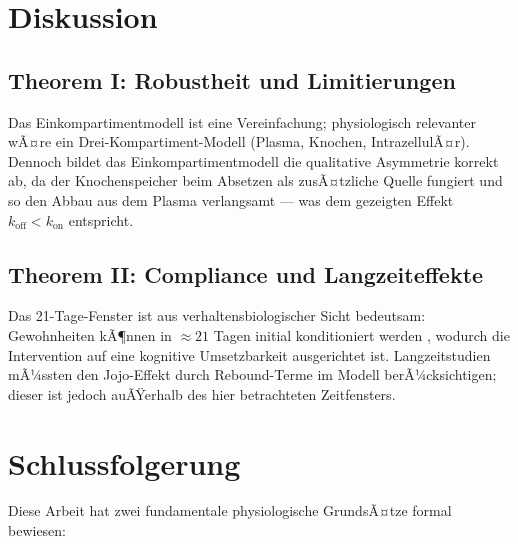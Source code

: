 ﻿\documentclass[12pt,a4paper]{article}
\theoremstyle{plain}
\theoremstyle{definition}
\theoremstyle{remark}
\begin{document}
\section{Diskussion}
\label{sec:disc}

\subsection{Theorem I: Robustheit und Limitierungen}

Das Einkompartimentmodell ist eine Vereinfachung; physiologisch relevanter
wÃ¤re ein Drei-Kompartiment-Modell (Plasma, Knochen, IntrazellulÃ¤r). Dennoch
bildet das Einkompartimentmodell die qualitative Asymmetrie korrekt ab, da
der Knochenspeicher beim Absetzen als zusÃ¤tzliche Quelle fungiert und so
den Abbau aus dem Plasma verlangsamt --- was dem gezeigten Effekt $k_\text{off}
< k_\text{on}$ entspricht.

\subsection{Theorem II: Compliance und Langzeiteffekte}

Das 21-Tage-Fenster ist aus verhaltensbiologischer Sicht bedeutsam:
Gewohnheiten kÃ¶nnen in $\approx 21$ Tagen initial konditioniert werden
\cite{Maltz1960}, wodurch die Intervention auf eine kognitive Umsetzbarkeit
ausgerichtet ist. Langzeitstudien mÃ¼ssten den Jojo-Effekt durch Rebound-Terme
im Modell berÃ¼cksichtigen; dieser ist jedoch auÃŸerhalb des hier betrachteten
Zeitfensters.

\section{Schlussfolgerung}
\label{sec:conc}

Diese Arbeit hat zwei fundamentale physiologische GrundsÃ¤tze formal bewiesen:
\end{document}
